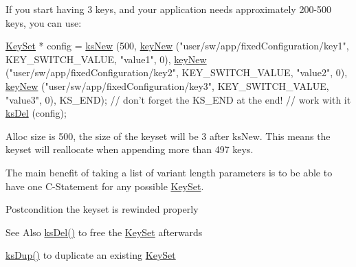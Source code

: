 If you start having 3 keys, and your application needs approximately 200-\/500 keys, you can use\-: 
\begin{DoxyCode}
\hyperlink{classkdb_1_1KeySet_a4eac9850fa4f06c07a5306befc3e4377}{KeySet} * config = \hyperlink{group__keyset_ga671e1aaee3ae9dc13b4834a4ddbd2c3c}{ksNew} (500,
        \hyperlink{group__key_gad23c65b44bf48d773759e1f9a4d43b89}{keyNew} (\textcolor{stringliteral}{"user/sw/app/fixedConfiguration/key1"}, KEY\_SWITCH\_VALUE, \textcolor{stringliteral}{
      "value1"}, 0),
        \hyperlink{group__key_gad23c65b44bf48d773759e1f9a4d43b89}{keyNew} (\textcolor{stringliteral}{"user/sw/app/fixedConfiguration/key2"}, KEY\_SWITCH\_VALUE, \textcolor{stringliteral}{
      "value2"}, 0),
        \hyperlink{group__key_gad23c65b44bf48d773759e1f9a4d43b89}{keyNew} (\textcolor{stringliteral}{"user/sw/app/fixedConfiguration/key3"}, KEY\_SWITCH\_VALUE, \textcolor{stringliteral}{
      "value3"}, 0),
        KS\_END); \textcolor{comment}{// don't forget the KS\_END at the end!}
\textcolor{comment}{// work with it}
\hyperlink{group__keyset_ga27e5c16473b02a422238c8d970db7ac8}{ksDel} (config);
\end{DoxyCode}
 Alloc size is 500, the size of the keyset will be 3 after ks\-New. This means the keyset will reallocate when appending more than 497 keys.

The main benefit of taking a list of variant length parameters is to be able to have one C-\/\-Statement for any possible \hyperlink{classkdb_1_1KeySet}{Key\-Set}.

\begin{DoxyPostcond}{Postcondition}
the keyset is rewinded properly
\end{DoxyPostcond}
\begin{DoxySeeAlso}{See Also}
\hyperlink{group__keyset_ga27e5c16473b02a422238c8d970db7ac8}{ks\-Del()} to free the \hyperlink{group__keyset}{Key\-Set} afterwards 

\hyperlink{group__keyset_gac59e4b328245463f1451f68d5106151c}{ks\-Dup()} to duplicate an existing \hyperlink{group__keyset}{Key\-Set} 
\end{DoxySeeAlso}

